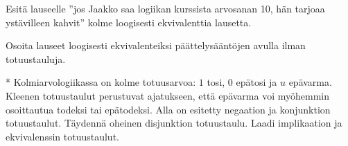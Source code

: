 \begin{tehtavasivu}
\begin{tehtava}
	Esitä lauseelle ''jos Jaakko saa logiikan kurssista
	arvosanan 10, hän tarjoaa ystävilleen kahvit'' kolme
	loogisesti ekvivalenttia lausetta.
\end{tehtava}

\begin{tehtava}
	Osoita lauseet loogisesti ekvivalenteiksi
	päättelysääntöjen avulla ilman totuustauluja.
\end{tehtava}

\begin{tehtava}
	* Kolmiarvologiikassa on kolme totuusarvoa: $1$
	tosi, $0$ epätosi ja $u$ epävarma. Kleenen totuustaulut
	perustuvat ajatukseen, että epävarma voi myöhemmin
	osoittautua todeksi tai epätodeksi. Alla on esitetty
	negaation ja konjunktion totuustaulut. Täydennä
	oheinen disjunktion totuustaulu. Laadi implikaation ja
	ekvivalenssin totuustaulut.


\end{tehtava}
\end{tehtavasivu}

